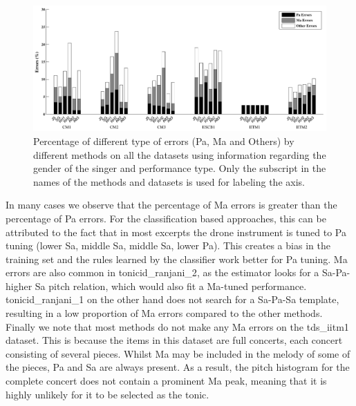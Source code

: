 {\begin{figure}
	\begin{center}
		\includegraphics[width=\figSizeHundred]{ch05_preprocessing/figures/ErrorAnalysis_With_MF.pdf}
	\end{center}
	\caption[Percentage of excerpts with Pa, Ma and `Other' type errors in tonic pitch identification by different approaches. In this configuration both the audio and the editorial metadata is used in the task.]{Percentage of different type of errors (Pa, Ma  and Others) by different methods on all the datasets using information regarding the gender of the singer and performance type. Only the subscript in the names of the methods and datasets is used for labeling the axis.}
	\label{fig:tonic_identification_errors_with_MF}
\end{figure}

In many cases we observe that the percentage of Ma errors is greater than the percentage of Pa errors. For the classification based approaches, this can be
attributed to the fact that in most excerpts the drone instrument is tuned to Pa tuning (lower Sa, middle Sa, middle Sa, lower Pa). This creates a
bias in the training set and the rules learned by the classifier work better for Pa tuning. Ma errors are also common in \acrshort{tonicid_ranjani_2}, as the estimator looks for a Sa-Pa-higher Sa pitch relation, which would also fit a Ma-tuned performance. \acrshort{tonicid_ranjani_1} on the other hand does not search for a Sa-Pa-Sa template, resulting in a low proportion of Ma errors compared to the other methods. Finally we note that most methods do not make any Ma errors on the \acrshort{tds_iitm1} dataset. This is because the items in this dataset are full concerts, each concert consisting of several pieces. Whilst Ma may be included in the melody of some of the pieces, Pa and Sa are always present. As a result, the pitch histogram for the complete concert does not contain a prominent Ma peak, meaning that it is highly unlikely for it to be selected as the tonic.



}
